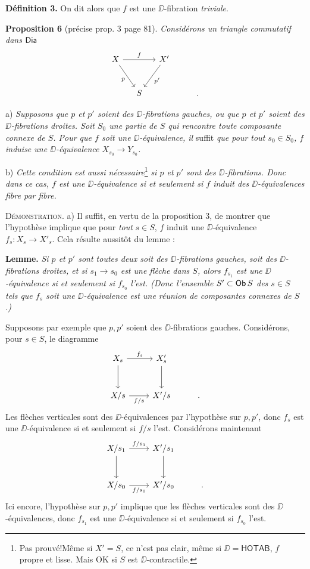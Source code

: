\textbf{Définition 3.} On dit alors que $f$ est une $\DD$-fibration \textit{triviale}.

\textbf{Proposition 6} (précise prop. 3 page 81). \textit{Considérons un triangle commutatif dans} $\mathsf{Dia}$
\[
\begin{tikzcd}[column sep=small, row sep=large]
X \arrow[rr, "f"] \arrow[dr, "p"'] & & X' \arrow[dl, "p'"] \\
& S & & & .
\end{tikzcd}
\]


\indent a) \textit{Supposons que $p$ et $p'$ soient des $\DD$-fibrations gauches, ou que $p$ et $p'$ soient des $\DD$-fibrations droites. Soit $S_0$ une partie de $S$ qui rencontre toute composante connexe de $S$. Pour que $f$ soit une $\DD$-équivalence, il} suffit \textit{que pour tout $s_0 \in S_0$, $f$ induise une $\DD$-équivalence $X_{s_0} \to Y_{s_0}$.}

\indent b) \textit{Cette condition est aussi nécessaire}\footnote[40]{Pas prouvé!\footnotemark[41] Même si $X' = S$, ce n'est pas clair, même si $\DD = \mathsf{HOTAB}$, $f$ propre et lisse. Mais OK si $S$ est $\DD$-contractile.} \textit{si $p$ et $p'$ sont des $\DD$-fibrations. Donc dans ce cas, $f$ est une $\DD$-équivalence si et seulement si $f$ induit des $\DD$-équivalences fibre par fibre.}


\textsc{Démonstration.} a) Il suffit, en vertu de la proposition 3, de montrer que l'hypothèse implique que pour \textit{tout} $s \in S$, $f$ induit une $\DD$-équivalence $f_s : X_s \to X'_s$. Cela résulte aussitôt du lemme :

\textbf{Lemme.} \textit{Si $p$ et $p'$ sont toutes deux soit des $\DD$-fibrations gauches, soit des $\DD$-fibrations droites, et si $s_1 \to s_0$ est une flèche dans $S$, alors $f_{s_1}$ est une $\DD$-équivalence si et seulement si $f_{s_0}$ l'est. (Donc l'ensemble $S' \subset \mathsf{Ob}\, S$ des $s \in S$ tels que $f_s$ soit une $\DD$-équivalence est une réunion de composantes connexes de $S$.)}

\indent Supposons par exemple que $p,p'$ soient des $\DD$-fibrations gauches. Considérons, pour $s \in S$, le diagramme
\[
\begin{tikzcd}[row sep=large]
X_s \arrow[r, "f_s"] \arrow[d] & X'_s \arrow[d] \\
X/s \arrow[r, "f/s"'] & X'/s & .
\end{tikzcd}
\]
Les flèches verticales sont des $\DD$-équivalences par l'hypothèse sur $p,p'$, donc $f_s$ est une $\DD$-équivalence si et seulement si $f/s$ l'est. Considérons maintenant
\[
\begin{tikzcd}[row sep=large]
X/s_1 \arrow[r, "f/s_1"] \arrow[d] & X'/s_1 \arrow[d] \\
X/s_0 \arrow[r, "f/s_0"'] & X'/s_0 & .
\end{tikzcd}
\]
Ici encore, l'hypothèse sur $p,p'$ implique que les flèches verticales sont des $\DD$-équivalences, donc $f_{s_1}$ est une $\DD$-équivalence si et seulement si $f_{s_0}$ l'est.

